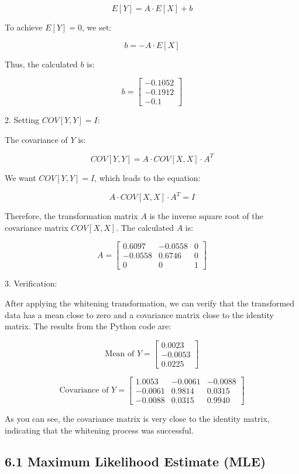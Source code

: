 \documentclass{article}
\begin{document}
\[
E[Y] = A \cdot E[X] + b
\]

To achieve \(E[Y] = 0\), we set:

\[
b = -A \cdot E[X]
\]

Thus, the calculated \(b\) is:

\[
b = \begin{bmatrix} -0.1052 \\ -0.1912 \\ -0.1 \end{bmatrix}
\]

2. Setting \(COV[Y,Y] = I\):

The covariance of \(Y\) is:

\[
COV[Y,Y] = A \cdot COV[X,X] \cdot A^T
\]

We want \(COV[Y,Y] = I\), which leads to the equation:

\[
A \cdot COV[X,X] \cdot A^T = I
\]

Therefore, the transformation matrix \(A\) is the inverse square root of the covariance matrix \(COV[X,X]\). The calculated \(A\) is:

\[
A = \begin{bmatrix} 
0.6097 & -0.0558 & 0 \\ 
-0.0558 & 0.6746 & 0 \\ 
0 & 0 & 1 
\end{bmatrix}
\]

3. Verification:

After applying the whitening transformation, we can verify that the transformed data has a mean close to zero and a covariance matrix close to the identity matrix. The results from the Python code are:

\[
\text{Mean of } Y = \begin{bmatrix} 0.0023 \\ -0.0053 \\ 0.0225 \end{bmatrix}
\]

\[
\text{Covariance of } Y = \begin{bmatrix} 
1.0053 & -0.0061 & -0.0088 \\ 
-0.0061 & 0.9814 & 0.0315 \\ 
-0.0088 & 0.0315 & 0.9940 
\end{bmatrix}
\]

As you can see, the covariance matrix is very close to the identity matrix, indicating that the whitening process was successful.


\subsection*{6.1 Maximum Likelihood Estimate (MLE)}
\end{document}
